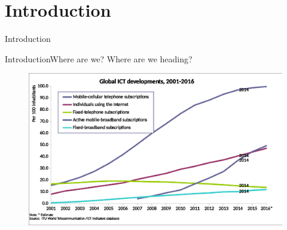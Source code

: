 
\section{Introduction}



    \begin{frame}[plain]{}

        \begin{center}

        \huge Introduction

        \end{center}

    \end{frame}



    \begin{frame}{Introduction}{Where are we? Where are we heading?}

%
%
%
%
%

        \begin{figure}[h]

            \centering

            \includegraphics[width=1\textwidth]{images/ict_Developments-2001_2016} 

            \label{fig:ictAdoption}


        \end{figure}


    \end{frame}


